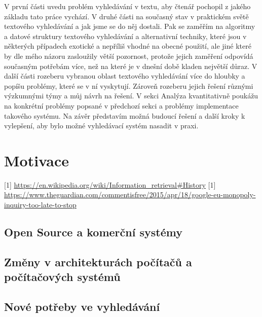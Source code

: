 \documentclass[11pt]{article}
\begin{document}
V první části uvedu problém vyhledávání v textu, aby čtenář pochopil z jakého
základu tato práce vychází. V druhé části na současný stav v praktickém světě
textového vyhledávání a jak jsme se do něj dostali. Pak se zaměřím na algoritmy
a datové struktury textového vyhledávání a alternativní techniky, které jsou v
některých případech exotické a nepříliš vhodné na obecné použití, ale jiné
které by dle mého názoru zasloužily větší pozornost, protože jejich zaměření
odpovídá současným potřebám více, než na které je v dnešní době kladen největší
důraz. V další části rozeberu vybranou oblast textového vyhledávání více do
hloubky a popíšu problémy, které se v ní vyskytují. Zároveň rozeberu jejich
řešení různými výzkumnými týmy a můj návrh na řešení. V sekci Analýza
kvantitativně poukážu na konkrétní problémy popsané v předchozí sekci a
problémy implementace takového systému. Na závěr představím možná budoucí
řešení a další kroky k vylepšení, aby bylo možné vyhledávací systém nasadit v
praxi.

\section{Motivace}
[1] \url{https://en.wikipedia.org/wiki/Information_retrieval#History}
[1] \url{https://www.theguardian.com/commentisfree/2015/apr/18/google-eu-monopoly-inquiry-too-late-to-stop}

\subsection{Open Source a komerční systémy}

\subsection{Změny v architekturách počítačů a počítačových systémů}


\subsection{Nové potřeby ve vyhledávání}
\end{document}
